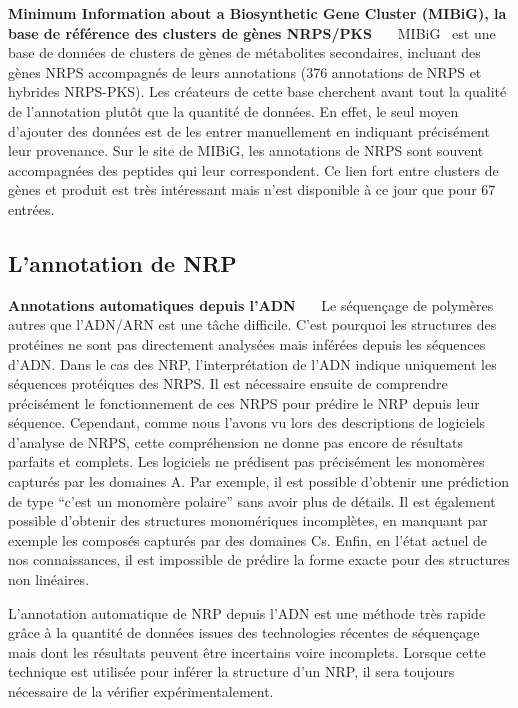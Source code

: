 \textbf{Minimum Information about a Biosynthetic Gene Cluster (MIBiG), la base de référence des clusters de gènes NRPS/PKS}~~~
MIBiG~\cite{medema_minimum_2015} est une base de données de clusters de gènes de métabolites secondaires, incluant des gènes NRPS accompagnés de leurs annotations (376 annotations de NRPS et hybrides NRPS-PKS).
Les créateurs de cette base cherchent avant tout la qualité de l'annotation plutôt que la quantité de données.
En effet, le seul moyen d'ajouter des données est de les entrer manuellement en indiquant précisément leur provenance.
Sur le site de MIBiG, les annotations de NRPS sont souvent accompagnées des peptides qui leur correspondent.
Ce lien fort entre clusters de gènes et produit est très intéressant mais n'est disponible à ce jour que pour 67 entrées.



\subsection{L'annotation de NRP}

\textbf{Annotations automatiques depuis l'ADN}~~~
Le séquençage de polymères autres que l'ADN/ARN est une tâche difficile.
C'est pourquoi les structures des protéines ne sont pas directement analysées mais inférées depuis les séquences d'ADN.
Dans le cas des NRP, l'interprétation de l'ADN indique uniquement les séquences protéiques des NRPS.
Il est nécessaire ensuite de comprendre précisément le fonctionnement de ces NRPS pour prédire le NRP depuis leur séquence.
Cependant, comme nous l'avons vu lors des descriptions de logiciels d'analyse de NRPS, cette compréhension ne donne pas encore de résultats parfaits et complets.
Les logiciels ne prédisent pas précisément les monomères capturés par les domaines A.
Par exemple, il est possible d'obtenir une prédiction de type ``c'est un monomère polaire'' sans avoir plus de détails.
Il est également possible d'obtenir des structures monomériques incomplètes, en manquant par exemple les composés capturés par des domaines Cs.
Enfin, en l'état actuel de nos connaissances, il est impossible de prédire la forme exacte pour des structures non linéaires.

L'annotation automatique de NRP depuis l'ADN est une méthode très rapide grâce à la quantité de données issues des technologies récentes de séquençage mais dont les résultats peuvent être incertains voire incomplets.
Lorsque cette technique est utilisée pour inférer la structure d'un NRP, il sera toujours nécessaire de la vérifier expérimentalement.



